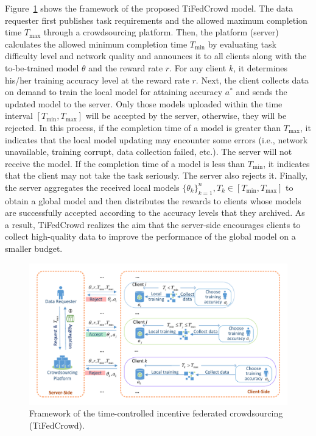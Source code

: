 \documentclass[final,1p,times]{elsarticle}
\begin{document}
Figure~\ref{fig:framework} shows the framework of the proposed TiFedCrowd model. The data requester first publishes task requirements and the allowed maximum completion time $T_{\max}$ through a crowdsourcing platform. Then, the platform (server) calculates the allowed minimum completion time $T_{\min}$ by evaluating task difficulty level and network quality and announces it to all clients along with the to-be-trained model $\theta$ and the reward rate $r$. For any client $k$, it determines his/her training accuracy level at the reward rate $r$. Next, the client collects data on demand to train the local model for attaining accuracy $a^\ast$ and sends the updated model to the server. Only those models uploaded within the time interval $[T_{\min},T_{\max}]$ will be accepted by the server, otherwise, they will be rejected. In this process, if the completion time of a model is greater than $T_{\max}$, it indicates that the local model updating may encounter some errors (i.e., network unavailable, training corrupt, data collection failed, etc.). The server will not receive the model. If the completion time of a model is less than $T_{\min}$, it indicates that the client may not take the task seriously. The server also rejects it.  Finally, the server aggregates the received local models $\{\theta_k\}_{k=1}^n,T_k\in[T_{\min},T_{\max}]$ to obtain a global model and then distributes the rewards to clients whose models are successfully accepted according to the accuracy levels that they archived. As a result, TiFedCrowd realizes the aim that the server-side encourages clients to collect high-quality data to improve the performance of the global model on a smaller budget.
\begin{figure}
	\centering
	\includegraphics[width=5.5in]{TiFedCrowd framework.pdf}
	\caption{Framework of the time-controlled incentive federated crowdsourcing (TiFedCrowd).}
	\label{fig:framework}
\end{figure}
\end{document}

